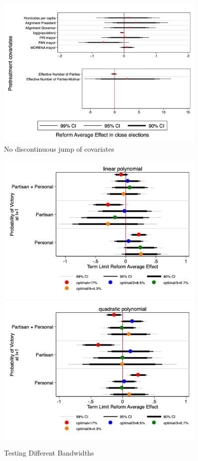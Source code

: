 \documentclass[12pt]{amsart}
\numberwithin{equation}{section}
\theoremstyle{definition}
\theoremstyle{definition}
\theoremstyle{definition}
\begin{document}
\begin{appendix}
 \begin{figure}[h]   
\centering
 \caption{No discontinuous jump of covariates}
 \label{fig:parallel_trend}
\includegraphics[width=0.9\textwidth]{../Figures/nojump.png}
       \captionsetup{justification=centering}
    
   
\end{figure} 


 \begin{figure}[h]   
\centering
 \caption{Testing Different Bandwidths}
 \label{fig:parallel_trend}
\includegraphics[width=0.9\textwidth]{../Figures/many_bandwidths_linear.png}
       \captionsetup{justification=centering}
 \includegraphics[width=0.9\textwidth]{../Figures/many_bandwidths_quadratic.png}


\end{figure}
\end{appendix}
\end{document}
